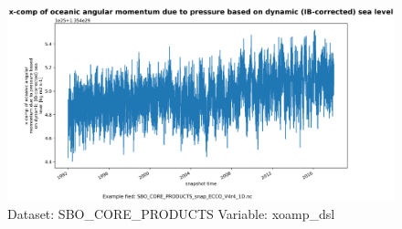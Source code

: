 \begin{figure}[H]
\centering
\includegraphics[scale=0.55]{../images/plots/oneD_plots/SBO_Core_Products/xoamp_dsl.png}
\caption{Dataset: SBO\_CORE\_PRODUCTS Variable: xoamp\_dsl}
\label{tab:table-SBO_CORE_PRODUCTS_xoamp_dsl-Plot}
\end{figure}
\pagebreak
